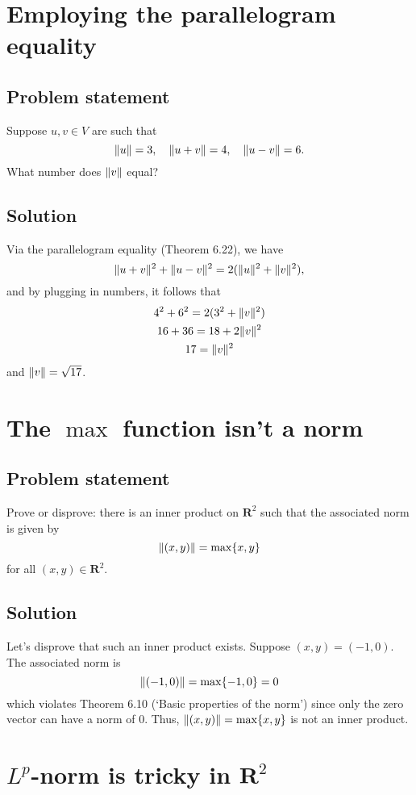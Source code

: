 \documentclass{article}
\begin{document}
\clearpage

\section{Employing the parallelogram equality}
\subsection*{Problem statement}
Suppose $u,v\in V$ are such that 
\[\lVert u\rVert=3,\quad \lVert u+v\rVert=4,\quad \lVert u-v\rVert=6.\]
What number does $\lVert v\rVert$ equal?

\subsection*{Solution}
Via the parallelogram equality (Theorem 6.22), we have
\[\lVert u+v\rVert^2+\lVert u-v\rVert^2=2(\lVert u\rVert^2+\lVert v\rVert^2),\]
and by plugging in numbers, it follows that
\begin{gather*}
    4^2+6^2=2(3^2+\lVert v\rVert^2)\\
    16+36=18+2\lVert v\rVert^2\\
    17=\lVert v\rVert^2
\end{gather*}
and $\lVert v\rVert=\sqrt{17}$.

\clearpage

\section{The $\max$ function isn't a norm}
\subsection*{Problem statement}
Prove or disprove: there is an inner product on $\mathbf{R}^2$ such that the associated norm is given by
\[\lVert(x,y)\rVert=\max\{x,y\}\]
for all $(x,y)\in\mathbf{R}^2$.

\subsection*{Solution}
Let's disprove that such an inner product exists. 
Suppose $(x,y)=(-1,0)$. 
The associated norm is
\[\lVert(-1,0)\rVert=\max\{-1,0\}=0\]
which violates Theorem 6.10 (`Basic properties of the norm') since only the zero vector can have a norm of $0$. 
Thus, $\lVert(x,y)\rVert=\max\{x,y\}$ is not an inner product.

\clearpage

\section{$L^p$-norm is tricky in $\mathbf{R}^2$}
\end{document}
